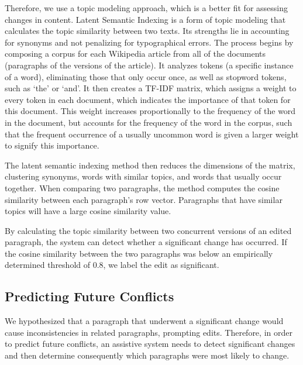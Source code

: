 Therefore, we use a topic modeling approach, which is a better fit for
assessing changes in content. Latent Semantic Indexing is a form of
topic modeling that calculates the topic similarity between two texts.
Its strengths lie in accounting for synonyms and not penalizing for
typographical errors. The process begins by composing a corpus for each
Wikipedia article from all of the documents (paragraphs of the versions
of the article). It analyzes tokens (a specific instance of a word),
eliminating those that only occur once, as well as stopword tokens, such
as `the' or `and'. It then creates a TF-IDF matrix, which assigns a
weight to every token in each document, which indicates the importance
of that token for this document. This weight increases proportionally to
the frequency of the word in the document, but accounts for the
frequency of the word in the corpus, such that the frequent occurrence
of a usually uncommon word is given a larger weight to signify this
importance.

The latent semantic indexing method then reduces the dimensions of the
matrix, clustering synonyms, words with similar topics, and words that
usually occur together. When comparing two paragraphs, the method
computes the cosine similarity between each paragraph's row vector.
Paragraphs that have similar topics will have a large cosine similarity
value.

By calculating the topic similarity between two concurrent versions of
an edited paragraph, the system can detect whether a significant change
has occurred. If the cosine similarity between the two paragraphs was
below an empirically determined threshold of 0.8, we label the edit as
significant.

\subsection{Predicting Future
Conflicts}\label{predicting-future-conflicts}

We hypothesized that a paragraph that underwent a significant change
would cause inconsistencies in related paragraphs, prompting edits.
Therefore, in order to predict future conflicts, an assistive system
needs to detect significant changes and then determine consequently
which paragraphs were most likely to change.

